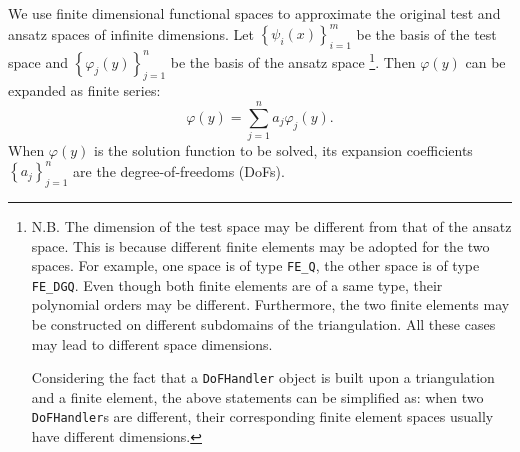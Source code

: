 \documentclass[11pt, a4paper]{book}
\begin{document}
We use finite dimensional functional spaces to approximate the original test and ansatz
spaces of infinite dimensions. Let $\left\{ \psi_i(x) \right\}_{i=1}^m$ be the basis of
the test space and $\left\{ \varphi_j(y) \right\}_{j=1}^n$ be the basis of the ansatz
space \footnote{N.B. The dimension of the test space may be different from that of the ansatz
  space. This is because different finite elements may be adopted for the two spaces. For
  example, one space is of type \texttt{FE\_Q}, the other space is of type
  \texttt{FE\_DGQ}. Even though both finite elements are of a same type, their polynomial
  orders may be different. Furthermore, the two finite elements may be constructed on
  different subdomains of the triangulation. All these cases may lead to different space
  dimensions.

  Considering the fact that a \texttt{DoFHandler} object is built upon a triangulation and
  a finite element, the above statements can be simplified as: when two
  \texttt{DoFHandler}s are different, their corresponding finite element spaces usually
  have different dimensions.}. Then $\varphi(y)$ can be expanded as finite series:
\begin{equation}
  \varphi(y) = \sum_{j=1}^n a_j\varphi_j(y).
\end{equation}
When $\varphi(y)$ is the solution function to be solved, its expansion coefficients
$\left\{ a_j \right\}_{j=1}^n$ are the degree-of-freedoms (DoFs).
\end{document}
